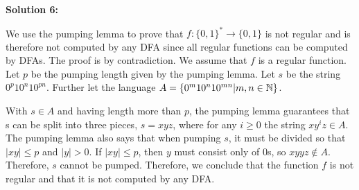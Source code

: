 \documentclass[11pt]{article}
\begin{document}
\textbf{Solution 6:}%

We use the pumping lemma to prove that $f:\{0,1\}^* \to \{0,1\}$ is not regular and is therefore not computed by any DFA since all regular functions can be computed by DFAs. The proof is by contradiction. We assume that $f$ is a regular function. Let $p$ be the pumping length given by the pumping lemma. Let $s$ be the string $0^p 1 0^n 1 0^{pn}$. Further let the language $A = \{0^m 1 0^n 1 0^{mn} | m,n \in \mathbb{N}\}$.

With $s \in A$ and having length more than $p$, the pumping lemma guarantees that s can be split into three pieces, $s = xyz$, where for any $i \geq 0$ the string $xy^iz \in A$. The pumping lemma also says that when pumping $s$, it must be divided so that $|xy| \leq p$ and $|y| > 0$. If $|xy| \leq p$, then $y$ must consist only of 0s, so $xyyz \notin A$. Therefore, $s$ cannot be pumped. Therefore, we conclude that the function $f$ is not regular and that it is not computed by any DFA.
\end{document}
